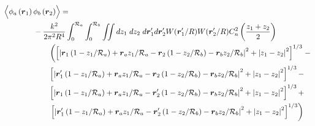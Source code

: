 \begin{equation}\label{prphase_n3}
\begin{aligned}
& \left\langle \vphantom{\hat{\phi}_{a}} \phi_{a}\left(\boldsymbol{r}_{1}\right) \phi_{b}\left(\boldsymbol{r}_{2}\right)\right\rangle = \\
&\quad\quad\quad\quad
-\frac{k^{2}}{2\pi^{2}R^{4}} \int_{0}^{\mathcal{R}_{a}}  \int_{0}^{\mathcal{R}_{b}} \iint dz_{1} \; dz_{2} \; d\boldsymbol{r}^{\prime}_{1}d\boldsymbol{r}^{\prime}_{2}  
W(\boldsymbol{r}^{\prime}_{1}/R) W(\boldsymbol{r}^{\prime}_{2}/R) C_{n}^{2}\left(\frac{z_{1} + z_{2}}{2}\right) \\
&\quad\quad\quad\quad\quad\quad
\left(
\left[ \left\vert \boldsymbol{r}_{1}\left(1-z_{1}/\mathcal{R}_{a}\right) + \boldsymbol{r}_{a} z_{1}/\mathcal{R}_{a} - 
\boldsymbol{r}_{2}\left(1-z_{2}/\mathcal{R}_{b}\right) - \boldsymbol{r}_{b} z_{2}/\mathcal{R}_{b}\right\vert^{2} + 
\left\vert z_{1} - z_{2} \right\vert^{2}\right]^{1/3}
\right. -\\
& \quad\quad\quad\quad\quad\quad
\left[ \left\vert \boldsymbol{r}^{\prime}_{1}\left(1-z_{1}/\mathcal{R}_{a}\right) + \boldsymbol{r}_{a} z_{1}/\mathcal{R}_{a} - 
\boldsymbol{r}_{2}\left(1-z_{2}/\mathcal{R}_{b}\right) - \boldsymbol{r}_{b} z_{2}/\mathcal{R}_{b}\right\vert^{2} + 
\left\vert z_{1} - z_{2} \right\vert^{2}\right]^{1/3} - \\
& \quad\quad\quad\quad\quad\quad
\left[ \left\vert \boldsymbol{r}_{1}\left(1-z_{1}/\mathcal{R}_{a}\right) + \boldsymbol{r}_{a} z_{1}/\mathcal{R}_{a} - 
\boldsymbol{r}^{\prime}_{2}\left(1-z_{2}/\mathcal{R}_{b}\right) - \boldsymbol{r}_{b} z_{2}/\mathcal{R}_{b}\right\vert^{2} + 
\left\vert z_{1} - z_{2} \right\vert^{2}\right]^{1/3} + \\
& \quad\quad\quad\quad\quad\quad
\left.
\left[ \left\vert \boldsymbol{r}^{\prime}_{1}\left(1-z_{1}/\mathcal{R}_{a}\right) + \boldsymbol{r}_{a} z_{1}/\mathcal{R}_{a} - 
\boldsymbol{r}^{\prime}_{2}\left(1-z_{2}/\mathcal{R}_{b}\right) - \boldsymbol{r}_{b} z_{2}/\mathcal{R}_{b}\right\vert^{2} + 
\left\vert z_{1} - z_{2} \right\vert^{2}\right]^{1/3}\right)
\end{aligned}
\end{equation}


